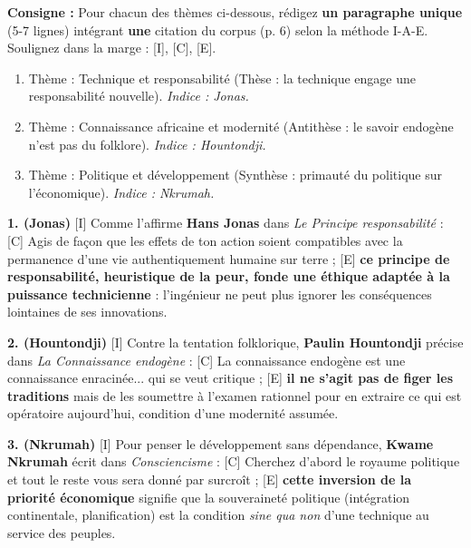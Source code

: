 \documentclass[11pt]{article}
\begin{document}
\begin{exercice}
\textbf{Consigne :} Pour chacun des thèmes ci-dessous, rédigez \textbf{un paragraphe unique} (5-7 lignes) intégrant \textbf{une} citation du corpus (p. 6) selon la méthode I-A-E. Soulignez dans la marge : [I], [C], [E].
\begin{enumerate}
    \item Thème : \og Technique et responsabilité \fg{} (Thèse : la technique engage une responsabilité nouvelle). \textit{Indice : Jonas.}
    \item Thème : \og Connaissance africaine et modernité \fg{} (Antithèse : le savoir endogène n'est pas du folklore). \textit{Indice : Hountondji.}
    \item Thème : \og Politique et développement \fg{} (Synthèse : primauté du politique sur l'économique). \textit{Indice : Nkrumah.}
\end{enumerate}
\end{exercice}

\begin{corrige}
\textbf{1. (Jonas)} [I] Comme l'affirme \textbf{Hans Jonas} dans \emph{Le Principe responsabilité} : [C] \og Agis de façon que les effets de ton action soient compatibles avec la permanence d'une vie authentiquement humaine sur terre \fg{} ; [E] \textbf{ce principe de responsabilité, heuristique de la peur, fonde une éthique adaptée à la puissance technicienne} : l'ingénieur ne peut plus ignorer les conséquences lointaines de ses innovations.

\textbf{2. (Hountondji)} [I] Contre la tentation folklorique, \textbf{Paulin Hountondji} précise dans \emph{La Connaissance endogène} : [C] \og La connaissance endogène est une connaissance enracinée... qui se veut critique \fg{} ; [E] \textbf{il ne s'agit pas de figer les traditions} mais de les soumettre à l'examen rationnel pour en extraire ce qui est opératoire aujourd'hui, condition d'une modernité assumée.

\textbf{3. (Nkrumah)} [I] Pour penser le développement sans dépendance, \textbf{Kwame Nkrumah} écrit dans \emph{Consciencisme} : [C] \og Cherchez d'abord le royaume politique et tout le reste vous sera donné par surcroît \fg{} ; [E] \textbf{cette inversion de la priorité économique} signifie que la souveraineté politique (intégration continentale, planification) est la condition \emph{sine qua non} d'une technique au service des peuples.
\end{corrige}
\end{document}
